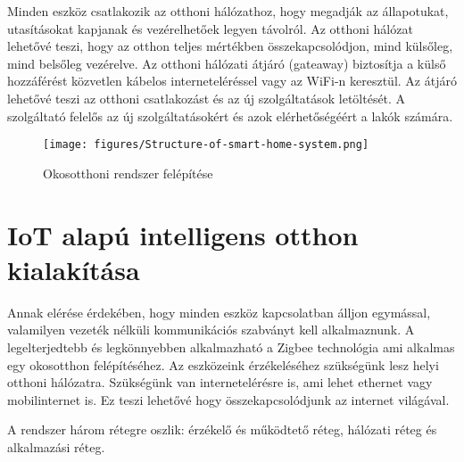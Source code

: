 Minden eszköz csatlakozik az otthoni hálózathoz, hogy megadják az állapotukat, utasításokat kapjanak és vezérelhetőek legyen távolról. Az otthoni hálózat lehetővé teszi, hogy az otthon teljes mértékben összekapcsolódjon, mind külsőleg, mind belsőleg vezérelve. Az otthoni hálózati átjáró (gateaway) biztosítja a külső hozzáférést közvetlen kábelos interneteléréssel vagy az WiFi-n keresztül. Az átjáró lehetővé teszi az otthoni csatlakozást és az új szolgáltatások letöltését. A szolgáltató felelős az új szolgáltatásokért és azok elérhetőségéért a lakók számára.\cite{ricquebourg2006smart}
\begin{figure}[!ht]
    \centering
    \texttt{[image: figures/Structure-of-smart-home-system.png]}
    \caption{Okosotthoni rendszer felépítése}
\end{figure}

\section{IoT alapú intelligens otthon kialakítása}
Annak elérése érdekében, hogy minden eszköz kapcsolatban álljon egymással, valamilyen vezeték nélküli kommunikációs szabványt kell alkalmaznunk. A legelterjedtebb és legkönnyebben alkalmazható a Zigbee technológia ami alkalmas egy okosotthon felépítéséhez. Az eszközeink érzékeléséhez szükségünk lesz helyi otthoni hálózatra. Szükségünk van internetelérésre is, ami lehet ethernet vagy mobilinternet is. Ez teszi lehetővé hogy összekapcsolódjunk az internet világával. 
\par A rendszer három rétegre oszlik: érzékelő és működtető réteg, hálózati réteg és alkalmazási réteg.


